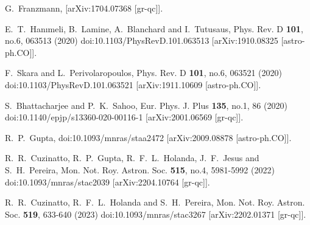 \documentclass[jkps,preprint,fleqn]{revtex4} %
\begin{document}
\begin{thebibliography}{999}
G.~Franzmann,
[arXiv:1704.07368 [gr-qc]].


E.~T.~Hanımeli, B.~Lamine, A.~Blanchard and I.~Tutusaus,
Phys. Rev. D \textbf{101}, no.6, 063513 (2020)
doi:10.1103/PhysRevD.101.063513
[arXiv:1910.08325 [astro-ph.CO]].

F.~Skara and L.~Perivolaropoulos,
Phys. Rev. D \textbf{101}, no.6, 063521 (2020)
doi:10.1103/PhysRevD.101.063521
[arXiv:1911.10609 [astro-ph.CO]].

S.~Bhattacharjee and P.~K.~Sahoo,
Eur. Phys. J. Plus \textbf{135}, no.1, 86 (2020)
doi:10.1140/epjp/s13360-020-00116-1
[arXiv:2001.06569 [gr-qc]].

R.~P.~Gupta,
doi:10.1093/mnras/staa2472
[arXiv:2009.08878 [astro-ph.CO]].

R.~R.~Cuzinatto, R.~P.~Gupta, R.~F.~L.~Holanda, J.~F.~Jesus and S.~H.~Pereira,
Mon. Not. Roy. Astron. Soc. \textbf{515}, no.4, 5981-5992 (2022)
doi:10.1093/mnras/stac2039
[arXiv:2204.10764 [gr-qc]].


R.~R.~Cuzinatto, R.~F.~L.~Holanda and S.~H.~Pereira,
Mon. Not. Roy. Astron. Soc. \textbf{519}, 633-640 (2023)
doi:10.1093/mnras/stac3267
[arXiv:2202.01371 [gr-qc]].


\end{thebibliography}
\end{document}
